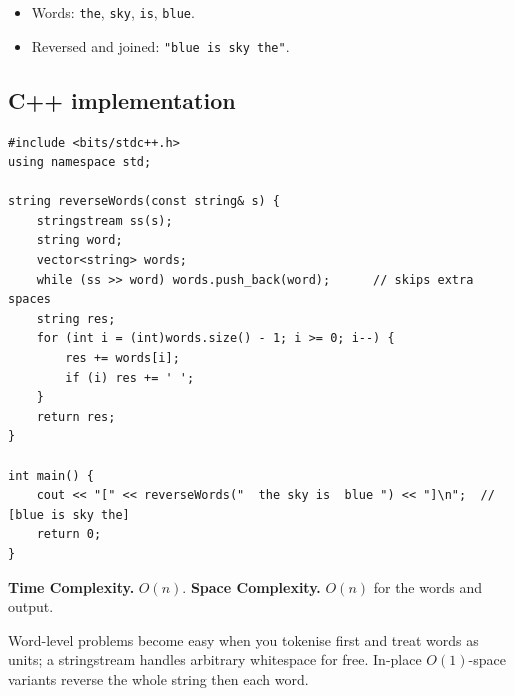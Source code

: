 
\begin{itemize}
  \item Words: \texttt{the}, \texttt{sky}, \texttt{is}, \texttt{blue}.
  \item Reversed and joined: \texttt{"blue is sky the"}.
\end{itemize}

\subsection*{C++ implementation}

\begin{lstlisting}
#include <bits/stdc++.h>
using namespace std;

string reverseWords(const string& s) {
    stringstream ss(s);
    string word;
    vector<string> words;
    while (ss >> word) words.push_back(word);      // skips extra spaces
    string res;
    for (int i = (int)words.size() - 1; i >= 0; i--) {
        res += words[i];
        if (i) res += ' ';
    }
    return res;
}

int main() {
    cout << "[" << reverseWords("  the sky is  blue ") << "]\n";  // [blue is sky the]
    return 0;
}
\end{lstlisting}

\begin{complexitybox}
\textbf{Time Complexity.} $O(n)$. \textbf{Space Complexity.} $O(n)$ for the
words and output.
\end{complexitybox}

\begin{takeawaybox}
Word-level problems become easy when you tokenise first and treat words as
units; a stringstream handles arbitrary whitespace for free. In-place
$O(1)$-space variants reverse the whole string then each word.
\end{takeawaybox}

